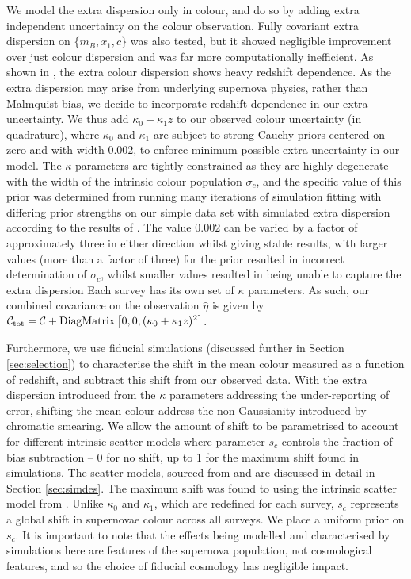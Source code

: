 \documentclass[a4paper,fleqn,usenatbib]{mnras}
\begin{document}
We model the extra dispersion only in colour, and do so by adding extra independent uncertainty on the colour observation. Fully covariant extra dispersion on $\lbrace m_B, x_1, c \rbrace$ was also tested, but it showed negligible improvement over just colour dispersion and was far more computationally inefficient. As shown in \citep{Kessler2013}, the extra colour dispersion shows heavy redshift dependence. As the extra dispersion may arise from underlying supernova physics, rather than Malmquist bias, we decide to incorporate redshift dependence in our extra uncertainty. We thus add $\kappa_0 + \kappa_1 z$ to our observed colour uncertainty (in quadrature), where $\kappa_0$ and $\kappa_1$ are subject to strong Cauchy priors centered on zero and with width $0.002$, to enforce minimum possible extra uncertainty in our model. The $\kappa$ parameters are tightly constrained as they are highly degenerate with the width of the intrinsic colour population $\sigma_c$, and the specific value of this prior was determined from running many iterations of simulation fitting with differing prior strengths on our simple data set with simulated extra dispersion according to the results of \citet{Kessler2013}. The value $0.002$ can be varied by a factor of approximately three in either direction whilst giving stable results, with larger values (more than a factor of three) for the prior resulted in incorrect determination of $\sigma_c$, whilst smaller values resulted in being unable to capture the extra dispersion  Each survey has its own set of $\kappa$ parameters. As such, our combined covariance on the observation $\hat{\eta}$ is given by $\mathcal{C}_{\rm tot} = \mathcal{C} + {\rm DiagMatrix}\left[0, 0, (\kappa_0 + \kappa_1 z)^2\right]$.


Furthermore, we use fiducial simulations (discussed further in Section \ref{sec:selection}) to characterise the shift in the mean colour measured as a function of redshift, and subtract this shift from our observed data. With the extra dispersion introduced from the $\kappa$ parameters addressing the under-reporting of error, shifting the mean colour address the non-Gaussianity introduced by chromatic smearing. We allow the amount of shift to be parametrised to account for different intrinsic scatter models where parameter $s_c$ controls the fraction of bias subtraction -- 0 for no shift, up to 1 for the maximum shift found in simulations. The scatter models, sourced from \citet{Guy2010} and \citet{Chotard2011} are discussed in detail in Section \ref{sec:simdes}. The maximum shift was found to using the intrinsic scatter model from \citet{Chotard2011}. Unlike $\kappa_0$ and $\kappa_1$, which are redefined for each survey, $s_c$ represents a global shift in supernovae colour across all surveys. We place a uniform prior on $s_c$. It is important to note that the effects being modelled and characterised by simulations here are features of the supernova population, not cosmological features, and so the choice of fiducial cosmology has negligible impact.
\end{document}
